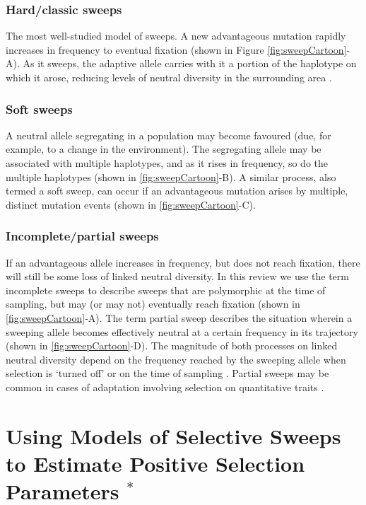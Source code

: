 \subsubsection{Hard/classic sweeps} 
 
The most well-studied model of sweeps. A new advantageous mutation rapidly increases in frequency to eventual fixation (shown in Figure \ref{fig:sweepCartoon}-A). As it sweeps, the adaptive allele carries with it a portion of the haplotype on which it arose, reducing levels of neutral diversity in the surrounding area \citep{RN124,RN235}. 
 
\subsubsection{Soft sweeps} 
  
A neutral allele segregating in a population may become favoured (due, for example, to a change in the environment). The segregating allele may be associated with multiple haplotypes, and as it rises in frequency, so do the multiple haplotypes (shown in \ref{fig:sweepCartoon}-B). A similar process, also termed a soft sweep, can occur if an advantageous mutation arises by multiple, distinct mutation events (shown in \ref{fig:sweepCartoon}-C). 
 
\subsubsection{Incomplete/partial sweeps} 
 
If an advantageous allele increases in frequency, but does not reach fixation, there will still be some loss of linked neutral diversity. In this review we use the term incomplete sweeps to describe sweeps that are polymorphic at the time of sampling, but may (or may not) eventually reach fixation (shown in \ref{fig:sweepCartoon}-A). The term partial sweep describes the situation wherein a sweeping allele becomes effectively neutral at a certain frequency in its trajectory (shown in \ref{fig:sweepCartoon}-D). The magnitude of both processes on linked neutral diversity depend on the frequency reached by the sweeping allele when selection is ‘turned off’ or on the time of sampling \citep{RN226}. Partial sweeps may be common in cases of adaptation involving selection on quantitative traits \citep{RN147}. 



\section[Using models of selective sweeps to estimate positive selection parameters]{Using Models of Selective Sweeps to Estimate Positive Selection Parameters $^*$}
 
